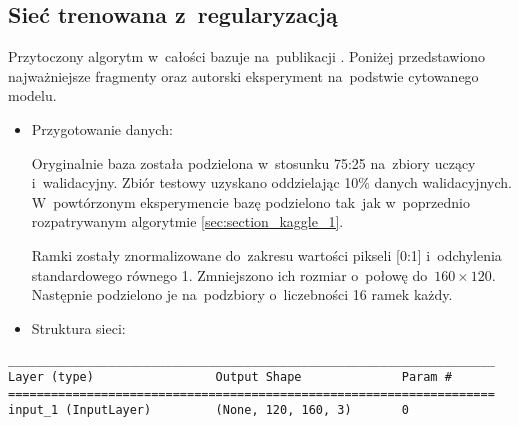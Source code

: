 \subsection{Sieć trenowana z~regularyzacją}
\label{sec:section_kaggle_2}
Przytoczony algorytm w~całości bazuje na~publikacji \cite{kaggle_2}. Poniżej przedstawiono najważniejsze fragmenty oraz autorski eksperyment na~podstwie cytowanego modelu.

{\parindent0pt %
\begin{itemize}
\item Przygotowanie danych:

Oryginalnie baza została podzielona w~stosunku 75:25 na~zbiory uczący i~walidacyjny. Zbiór testowy uzyskano oddzielając 10\% danych walidacyjnych. W~powtórzonym eksperymencie bazę podzielono tak~jak w~poprzednio rozpatrywanym algorytmie \ref{sec:section_kaggle_1}.

Ramki zostały znormalizowane do~zakresu wartości pikseli [0:1] i~odchylenia standardowego równego 1. Zmniejszono ich rozmiar o~połowę do~$160\times120$. Następnie podzielono je na~podzbiory o~liczebności 16 ramek każdy.

\item Struktura sieci:
\end{itemize}

\newsavebox\myv
\begin{lrbox}{\myv}
\setlength{\myminipagewidth}{0.9\linewidth} %
\setlength{\myminipagecentering}{(\linewidth-\myminipagewidth)/2}
\noindent\hspace{\myminipagecentering}\begin{minipage}{\myminipagewidth}
\begin{verbatim}
____________________________________________________________________
Layer (type)                 Output Shape              Param #   
====================================================================
input_1 (InputLayer)         (None, 120, 160, 3)       0        
\end{verbatim} 
\end{minipage}\end{lrbox}
\resizebox{0.75\textwidth}{!}{\usebox\myv}

}
